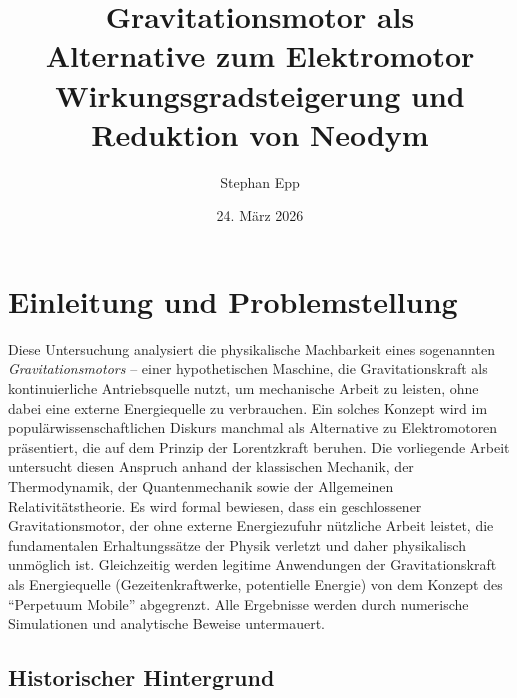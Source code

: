 ﻿\documentclass[12pt, a4paper]{report}
\title{\textbf{Gravitationsmotor als \\Alternative zum Elektromotor}\\
Wirkungsgradsteigerung und Reduktion von Neodym}
\author{Stephan Epp}
\date{24. März 2026}
\theoremstyle{definition}
\theoremstyle{remark}
\begin{document}

\maketitle
\tableofcontents
\newpage

\chapter{Einleitung und Problemstellung}
\label{sec:einleitung}

Diese Untersuchung analysiert die physikalische Machbarkeit eines sogenannten
\emph{Gravitationsmotors} -- einer hypothetischen Maschine, die Gravitationskraft
als kontinuierliche Antriebsquelle nutzt, um mechanische Arbeit zu leisten,
ohne dabei eine externe Energiequelle zu verbrauchen. Ein solches Konzept wird
im populärwissenschaftlichen Diskurs manchmal als Alternative zu Elektromotoren
präsentiert, die auf dem Prinzip der Lorentzkraft beruhen. Die vorliegende Arbeit
untersucht diesen Anspruch anhand der klassischen Mechanik, der Thermodynamik,
der Quantenmechanik sowie der Allgemeinen Relativitätstheorie. Es wird formal
bewiesen, dass ein geschlossener Gravitationsmotor, der ohne externe Energiezufuhr
nützliche Arbeit leistet, die fundamentalen Erhaltungssätze der Physik verletzt
und daher physikalisch unmöglich ist. Gleichzeitig werden legitime Anwendungen
der Gravitationskraft als Energiequelle (Gezeitenkraftwerke, potentielle Energie)
von dem Konzept des ``Perpetuum Mobile'' abgegrenzt. Alle Ergebnisse werden durch
numerische Simulationen und analytische Beweise untermauert.

\section{Historischer Hintergrund}
\end{document}
